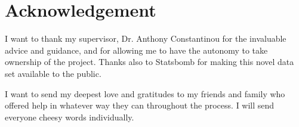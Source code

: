 \documentclass[conference]{IEEEtran}
\begin{document}



\newpage

\section*{Acknowledgement}

I want to thank my supervisor, Dr. Anthony Constantinou for the invaluable advice and guidance, and for allowing me to have the autonomy to take ownership of the project. Thanks also to Statsbomb for making this novel data set available to the public. 

I want to send my deepest love and gratitudes to my friends and family who offered help in whatever way they can throughout the process. I will send everyone cheesy words individually.
\end{document}
